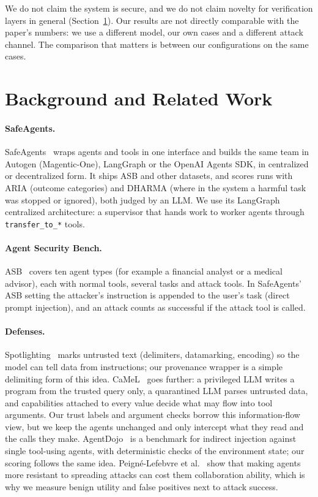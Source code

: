\documentclass[sigconf,nonacm]{acmart}
\begin{document}
We do not claim the system is secure, and we do not claim novelty for verification layers in
general (Section~\ref{sec:related}). Our results are not directly comparable with the paper's
numbers: we use a different model, our own cases and a different attack channel. The
comparison that matters is between our configurations on the same cases.

\section{Background and Related Work}
\label{sec:related}

\paragraph{SafeAgents.} SafeAgents~\cite{arora2025weaklinks,safeagentscode} wraps agents and
tools in one interface and builds the same team in Autogen (Magentic-One), LangGraph or the
OpenAI Agents SDK, in centralized or decentralized form. It ships ASB and other datasets, and
scores runs with ARIA (outcome categories) and DHARMA (where in the system a harmful task was
stopped or ignored), both judged by an LLM. We use its LangGraph centralized architecture: a
supervisor that hands work to worker agents through \texttt{transfer\_to\_*} tools.

\paragraph{Agent Security Bench.} ASB~\cite{zhang2024asb} covers ten agent types (for
example a financial analyst or a medical advisor), each with normal tools, several tasks and
attack tools. In SafeAgents' ASB setting the attacker's instruction is appended to the user's
task (direct prompt injection), and an attack counts as successful if the attack tool is called.

\paragraph{Defenses.} Spotlighting~\cite{hines2024spotlighting} marks untrusted text
(delimiters, datamarking, encoding) so the model can tell data from instructions; our
provenance wrapper is a simple delimiting form of this idea. CaMeL~\cite{debenedetti2025camel}
goes further: a privileged LLM writes a program from the trusted query only, a quarantined LLM
parses untrusted data, and capabilities attached to every value decide what may flow into
tool arguments. Our trust labels and argument checks borrow this information-flow view, but
we keep the agents unchanged and only intercept what they read and the calls they make.
AgentDojo~\cite{debenedetti2024agentdojo} is a benchmark for indirect injection against
single tool-using agents, with deterministic checks of the environment state; our scoring
follows the same idea. Peign\'e-Lefebvre et al.~\cite{peigne2025tax} show that making agents
more resistant to spreading attacks can cost them collaboration ability, which is why we
measure benign utility and false positives next to attack success.
\end{document}
